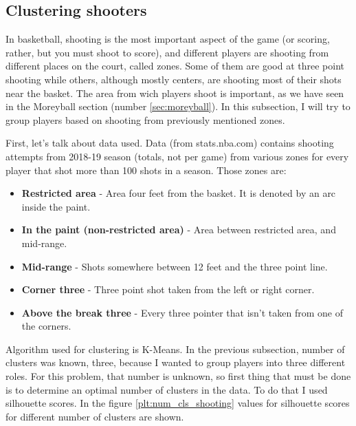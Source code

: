 \documentclass[a4paper]{article}
\begin{document}
\subsection{Clustering shooters}
\label{subsec:clust_shooters}

In basketball, shooting is the most important aspect of the game (or scoring, rather, but you must shoot to score), and different players are shooting from different places on the court, called zones. Some of them are good at three point shooting while others, although mostly centers, are shooting most of their shots near the basket. The area from wich players shoot is important, as we have seen in the Moreyball section (number \ref{sec:moreyball}). In this subsection, I will try to group players based on shooting from previously mentioned zones.

First, let's talk about data used. Data (from stats.nba.com) contains shooting attempts from 2018-19 season (totals, not per game) from various zones for every player that shot more than 100 shots in a season. Those zones are:

\begin{itemize}
	\item \textbf{Restricted area} - Area four feet from the basket. It is denoted by an arc inside the paint.
	\item \textbf{In the paint (non-restricted area)} - Area between restricted area, and mid-range.
	\item \textbf{Mid-range} - Shots somewhere between 12 feet and the three point line.
	\item \textbf{Corner three} - Three point shot taken from the left or right corner.
	\item \textbf{Above the break three} - Every three pointer that isn't taken from one of the corners. 
\end{itemize}

Algorithm used for clustering is K-Means. In the previous subsection, number of clusters was known, three, because I wanted to group players into three different roles. For this problem, that number is unknown, so first thing that must be done is to determine an optimal number of clusters in the data. To do that I used silhouette scores. In the figure \ref{plt:num_cls_shooting} values for silhouette scores for different number of clusters are shown. 
\end{document}
